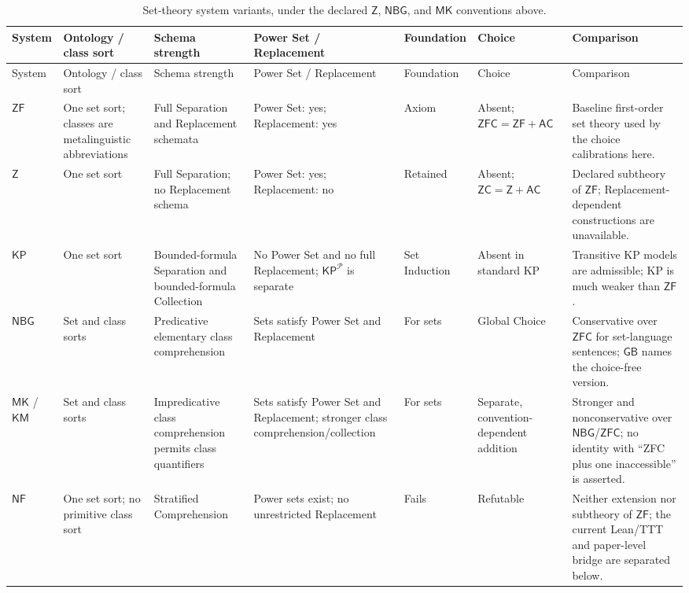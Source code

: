 \begin{landscape}
\begingroup\scriptsize
\setlength{\tabcolsep}{2.5pt}
\begin{longtable}{@{}p{.48in}p{.95in}p{1.15in}p{1.05in}p{.70in}
  p{.85in}p{1.65in}@{}}
\caption{Set-theory system variants, under the declared
  \(\mathsf Z\), \(\mathsf{NBG}\), and \(\mathsf{MK}\) conventions above.}
\label{tab:p06-set-theory-variants}\\
\toprule
System & Ontology / class sort & Schema strength & Power Set / Replacement &
Foundation & Choice & Comparison \\
\midrule
\endfirsthead
\toprule
System & Ontology / class sort & Schema strength & Power Set / Replacement &
Foundation & Choice & Comparison \\
\midrule
\endhead
\(\mathsf{ZF}\) & One set sort; classes are metalinguistic abbreviations &
Full Separation and Replacement schemata & Power Set: yes; Replacement: yes &
Axiom & Absent; \(\mathsf{ZFC}=\mathsf{ZF}+\mathsf{AC}\) & Baseline
first-order set theory used by the choice calibrations here. \\
\(\mathsf Z\) & One set sort & Full Separation; no Replacement schema &
Power Set: yes; Replacement: no & Retained & Absent;
\(\mathsf{ZC}=\mathsf Z+\mathsf{AC}\) & Declared subtheory of \(\mathsf{ZF}\);
Replacement-dependent constructions are unavailable. \\
\(\mathsf{KP}\) & One set sort & Bounded-formula Separation and
bounded-formula Collection & No Power Set and no full Replacement;
\(\mathsf{KP}^{\mathcal P}\) is separate & Set Induction & Absent in standard
KP & Transitive KP models are admissible; KP is much weaker than
\(\mathsf{ZF}\). \\
\(\mathsf{NBG}\) & Set and class sorts & Predicative elementary class
comprehension & Sets satisfy Power Set and Replacement & For sets & Global
Choice & Conservative over \(\mathsf{ZFC}\) for set-language sentences;
\(\mathsf{GB}\) names the choice-free version. \\
\(\mathsf{MK}\) / \(\mathsf{KM}\) & Set and class sorts & Impredicative class
comprehension permits class quantifiers & Sets satisfy Power Set and
Replacement; stronger class comprehension/collection & For sets & Separate,
convention-dependent addition & Stronger and nonconservative over
\(\mathsf{NBG}\)/\(\mathsf{ZFC}\); no identity with ``ZFC plus one
inaccessible'' is asserted. \\
\(\mathsf{NF}\) & One set sort; no primitive class sort & Stratified
Comprehension & Power sets exist; no unrestricted Replacement & Fails &
Refutable & Neither extension nor subtheory of \(\mathsf{ZF}\); the current
Lean/TTT and paper-level bridge are separated below. \\
\bottomrule
\end{longtable}
\endgroup
\end{landscape}

